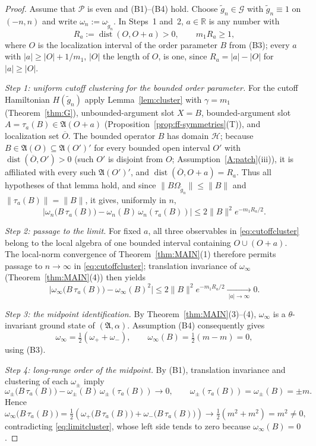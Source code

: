 \documentclass[11pt,a4paper]{article}
\theoremstyle{plain}
\theoremstyle{definition}
\theoremstyle{plain}
\theoremstyle{definition}
\newcommand{\R}{\mathbb{R}}
\newcommand{\A}{\mathfrak{A}}
\newcommand{\G}{\mathcal{G}}
\newcommand{\HH}{\mathcal{H}}
\newcommand{\Om}{\Omega}
\DeclareMathOperator{\dist}{dist}
\begin{document}
\begin{proof}
Assume that $\mathscr P$ is even and (B1)--(B4) hold. Choose $\widetilde g_n\in\G$ with
$\widetilde g_n\equiv1$ on $(-n,n)$
and write $\omega_n:=\omega_{\widetilde g_n}$. In Steps~1 and~2, $a\in\R$ is any number with
\[
 R_a:=\dist(O,O+a)>0,\qquad m_1R_a\ge1 ,
\]
where $O$ is the localization interval of the order parameter $B$ from (B3); every $a$ with
$|a|\ge|O|+1/m_1$, $|O|$ the length of $O$, is one, since $R_a=|a|-|O|$ for $|a|\ge|O|$.

\emph{Step 1: uniform cutoff clustering for the bounded order parameter.} For the cutoff
Hamiltonian $H(\widetilde g_n)$ apply Lemma~\ref{lem:cluster} with $\gamma=m_1$
(Theorem~\ref{thm:G}), unbounded-argument slot $X=B$, bounded-argument slot
$A=\tau_a(B)\in\A(O+a)$ (Proposition~\ref{prop:ff-symmetries}(T)), and localization set
$\overline O$. The bounded operator $B$ has
domain $\HH$; because $B\in\A(O)\subseteq\A(O')'$ for every bounded open interval $O'$ with
$\dist(\overline O,O')>0$ (such $O'$ is disjoint from $O$; Assumption~\ref{A:patch}(iii)), it is
affiliated with every such $\A(O')'$, and
$\dist(\overline O,O+a)=R_a$. Thus all hypotheses of that lemma hold, and since
$\|B\Om_{\widetilde g_n}\|\le\|B\|$ and $\|\tau_a(B)\|=\|B\|$, it gives, uniformly in $n$,
\begin{equation}
 \bigl|\omega_n\bigl(B\,\tau_a(B)\bigr)-\omega_n(B)\,\omega_n(\tau_a(B))\bigr|
 \le2\|B\|^2e^{-m_1R_a/2} .
 \label{eq:cutoffcluster}
\end{equation}

\emph{Step 2: passage to the limit.} For fixed $a$, all three observables in
\eqref{eq:cutoffcluster} belong to the local algebra of one bounded interval containing
$O\cup(O+a)$. The local-norm convergence of Theorem~\ref{thm:MAIN}(1) therefore permits
passage to $n\to\infty$ in \eqref{eq:cutoffcluster}; translation invariance of
$\omega_\infty$ (Theorem~\ref{thm:MAIN}(4)) then yields
\begin{equation}
 \bigl|\omega_\infty\bigl(B\,\tau_a(B)\bigr)-\omega_\infty(B)^2\bigr|
 \le2\|B\|^2e^{-m_1R_a/2}\xrightarrow[\ |a|\to\infty\ ]{}0 .
 \label{eq:limitcluster}
\end{equation}

\emph{Step 3: the midpoint identification.} By Theorem~\ref{thm:MAIN}(3)--(4),
$\omega_\infty$ is a $\theta$-invariant ground state of $(\A,\alpha)$. Assumption (B4)
consequently gives
\[
 \omega_\infty=\tfrac12(\omega_++\omega_-),\qquad
 \omega_\infty(B)=\tfrac12(m-m)=0 ,
\]
using (B3).

\emph{Step 4: long-range order of the midpoint.} By (B1), translation invariance and
clustering of each $\omega_\pm$ imply
\[
 \omega_\pm\bigl(B\,\tau_a(B)\bigr)
 -\omega_\pm(B)\,\omega_\pm(\tau_a(B))\longrightarrow0,\qquad
 \omega_\pm(\tau_a(B))=\omega_\pm(B)=\pm m .
\]
Hence
\[
 \omega_\infty\bigl(B\,\tau_a(B)\bigr)
 =\tfrac12\!\left(\omega_+\bigl(B\,\tau_a(B)\bigr)+\omega_-\bigl(B\,\tau_a(B)\bigr)\right)
 \longrightarrow\tfrac12(m^2+m^2)=m^2\ne0 ,
\]
contradicting \eqref{eq:limitcluster}, whose left side tends to zero because
$\omega_\infty(B)=0$.
\end{proof}
\end{document}
